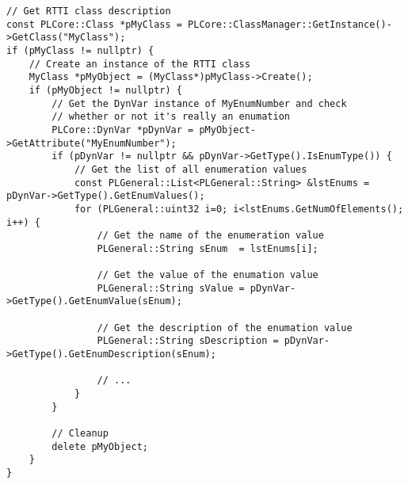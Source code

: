 \begin{lstlisting}[label=Code:RTTIDynamicUsageOfDynTypeInfoForEnumerationInformation,caption={Dynamic usage of \emph{PLCore::DynTypeInfo} for enumeration information}]
// Get RTTI class description
const PLCore::Class *pMyClass = PLCore::ClassManager::GetInstance()->GetClass("MyClass");
if (pMyClass != nullptr) {
	// Create an instance of the RTTI class
	MyClass *pMyObject = (MyClass*)pMyClass->Create();
	if (pMyObject != nullptr) {
		// Get the DynVar instance of MyEnumNumber and check
		// whether or not it's really an enumation
		PLCore::DynVar *pDynVar = pMyObject->GetAttribute("MyEnumNumber");
		if (pDynVar != nullptr && pDynVar->GetType().IsEnumType()) {
			// Get the list of all enumeration values
			const PLGeneral::List<PLGeneral::String> &lstEnums = pDynVar->GetType().GetEnumValues();
			for (PLGeneral::uint32 i=0; i<lstEnums.GetNumOfElements(); i++) {
				// Get the name of the enumeration value
				PLGeneral::String sEnum  = lstEnums[i];

				// Get the value of the enumation value
				PLGeneral::String sValue = pDynVar->GetType().GetEnumValue(sEnum);

				// Get the description of the enumation value
				PLGeneral::String sDescription = pDynVar->GetType().GetEnumDescription(sEnum);

				// ...
			}
		}

		// Cleanup
		delete pMyObject;
	}
}
\end{lstlisting}



